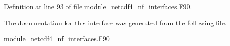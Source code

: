 Definition at line 93 of file module\+\_\+netcdf4\+\_\+nf\+\_\+interfaces.\+F90.



The documentation for this interface was generated from the following file\+:\begin{DoxyCompactItemize}
\item 
\hyperlink{module__netcdf4__nf__interfaces_8F90}{module\+\_\+netcdf4\+\_\+nf\+\_\+interfaces.\+F90}\end{DoxyCompactItemize}
